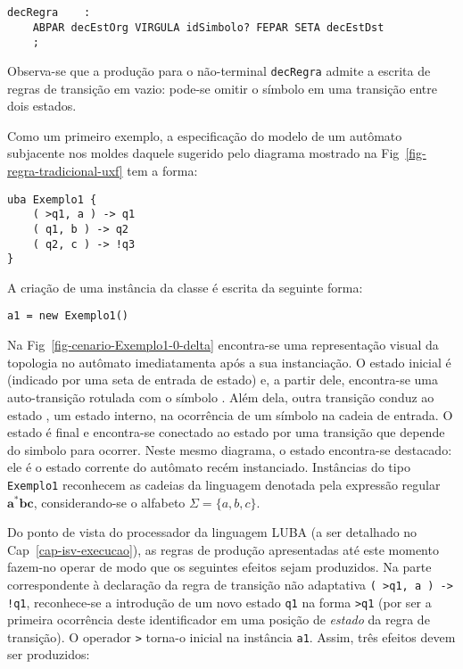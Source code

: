 \begin{lstlisting}[style=antlr]
decRegra	:
	ABPAR decEstOrg VIRGULA idSimbolo? FEPAR SETA decEstDst
	;
\end{lstlisting}

\noindent
Observa-se que a produção para o não-terminal \lstinline[style=antlr]!decRegra! admite a escrita de regras de transição em vazio: pode-se omitir o símbolo em uma transição entre dois estados.

Como um primeiro exemplo, a especificação do modelo de um autômato subjacente nos moldes daquele sugerido pelo diagrama mostrado na Fig~\ref{fig-regra-tradicional-uxf} tem a forma:

\begin{lstlisting}
uba Exemplo1 {
	( >q1, a ) -> q1
	( q1, b ) -> q2
	( q2, c ) -> !q3
}
\end{lstlisting}

\noindent
A criação de uma instância  da classe  é escrita da seguinte forma:

\begin{lstlisting}
a1 = new Exemplo1()
\end{lstlisting}

\noindent
Na Fig~\ref{fig-cenario-Exemplo1-0-delta} encontra-se uma representação visual da topologia no autômato imediatamenta após a sua instanciação. O estado inicial é  (indicado por uma seta de entrada de estado) e, a partir dele, encontra-se uma auto-transição rotulada com o símbolo . Além dela, outra transição conduz ao estado , um estado interno, na ocorrência de um símbolo  na cadeia de entrada. O estado  é final e encontra-se conectado ao estado  por uma transição que depende do simbolo  para ocorrer. Neste mesmo diagrama, o estado  encontra-se destacado: ele é o estado corrente do autômato recém instanciado. Instâncias do tipo \lstinline!Exemplo1! reconhecem as cadeias da linguagem denotada pela expressão regular $\mathbf{a^*bc}$, considerando-se o alfabeto $\Sigma=\{a, b, c\}$.


Do ponto de vista do processador da linguagem LUBA (a ser detalhado no Cap~\ref{cap-isv-execucao}), as regras de produção apresentadas até este momento fazem-no operar de modo que os seguintes efeitos sejam produzidos. Na parte correspondente à declaração da regra de transição não adaptativa \lstinline'( >q1, a ) -> !q1', reconhece-se a introdução de um novo estado \lstinline|q1| na forma \lstinline|>q1| (por ser a primeira ocorrência deste identificador em uma posição de \textit{estado} da regra de transição). O operador \lstinline|>| torna-o inicial na instância \lstinline|a1|. Assim, três efeitos devem ser produzidos:

